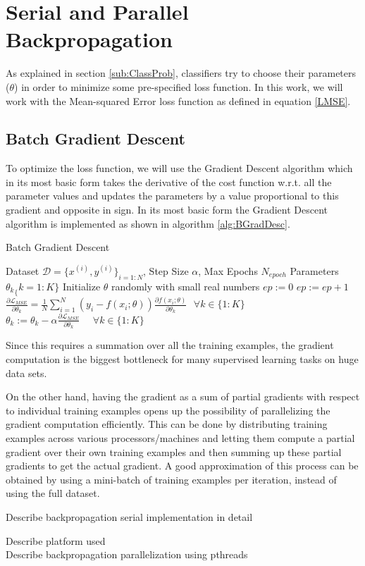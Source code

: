 \section{Serial and Parallel Backpropagation}
\label{BackProp}

As explained in section \ref{sub:ClassProb}, classifiers try to choose their parameters ($\theta$) in order to minimize some pre-specified loss function.
In this work, we will work with the Mean-squared Error loss function as defined in equation \ref{LMSE}.

\subsection{Batch Gradient Descent}
\label{sub:BGD}

To optimize the loss function, we will use the Gradient Descent algorithm which in its most basic form takes the derivative of the cost function w.r.t. all the parameter values and updates the parameters by a value proportional to this gradient and opposite in sign.
In its most basic form the Gradient Descent algorithm is implemented as shown in algorithm \ref{alg:BGradDesc}.
\begin{algorithm}[tb]
   \caption{Batch Gradient Descent}
   \label{alg:BGradDesc}
\begin{algorithmic}
    Dataset $\mathcal{D} = \{x^{(i)},y^{(i)}\}_{i=1:N}$, Step Size $\alpha$, Max Epochs $N_{epoch}$
    Parameters ${\theta_k}_\{k=1:K\}$
   \STATE
   \STATE Initialize $\theta$ randomly with small real numbers
   \STATE $ep := 0$
   \REPEAT
   \STATE $ep := ep + 1$
   \STATE $\frac{\partial \mathcal{L}_{MSE}}{\partial \theta_k} = \frac{1}{N} \sum_{i=1}^N ( y_i - f(x_i; \theta)) \frac{\partial f(x_i; \theta)}{\partial \theta_k} \hspace{8pt} \forall k \in \{1:K\}$
   \STATE $\theta_k := \theta_k - \alpha \frac{\partial \mathcal{L}_{MSE}}{\partial \theta_k} \hspace{16pt} \forall k \in \{1:K\}$
\end{algorithmic}
\end{algorithm}

Since this requires a summation over all the training examples, the gradient computation is the biggest bottleneck for many supervised learning tasks on huge data sets.

On the other hand, having the gradient as a sum of partial gradients with respect to individual training examples opens up the possibility of parallelizing the gradient computation efficiently.
This can be done by distributing training examples across various processors/machines and letting them compute a partial gradient over their own training examples and then summing up these partial gradients to get the actual gradient.
A good approximation of this process can be obtained by using a mini-batch of training examples per iteration, instead of using the full dataset.

Describe backpropagation serial implementation in detail

Describe platform used \\
Describe backpropagation parallelization using pthreads
